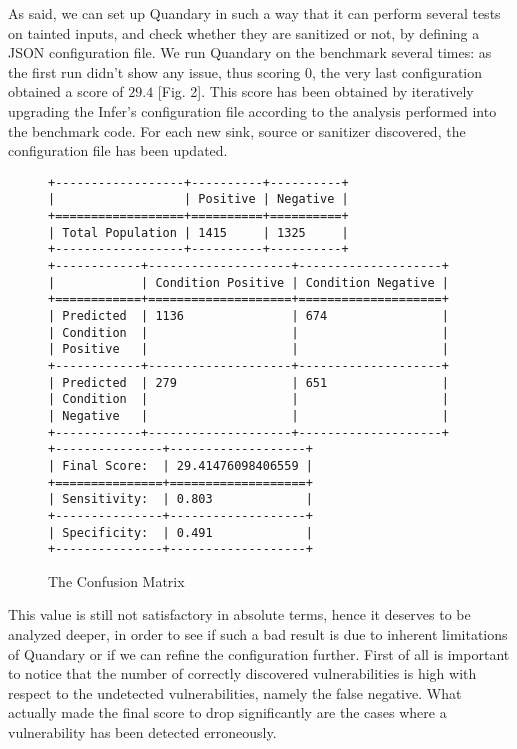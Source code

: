 \documentclass[../Report.tex]{subfiles}
\begin{document}
As said, we can set up Quandary in such a way that it can perform several tests on tainted inputs, and check whether they are sanitized or not, by defining a JSON configuration file. We run Quandary on the benchmark several times: as the first run didn't show any issue, thus scoring $0$, the very last configuration obtained a score of $29.4$ [Fig. 2]. 
This score has been obtained by iteratively upgrading the Infer's configuration file according to the analysis performed into the benchmark code. For each new sink, source or sanitizer discovered, the configuration file has been updated.\\


\begin{figure}
		\small{
			\begin{verbatim}
+------------------+----------+----------+
|                  | Positive | Negative |
+==================+==========+==========+
| Total Population | 1415     | 1325     |
+------------------+----------+----------+
+------------+--------------------+--------------------+
|            | Condition Positive | Condition Negative |
+============+====================+====================+
| Predicted  | 1136               | 674                |
| Condition  |                    |                    |
| Positive   |                    |                    |
+------------+--------------------+--------------------+
| Predicted  | 279                | 651                |
| Condition  |                    |                    |
| Negative   |                    |                    |
+------------+--------------------+--------------------+
+---------------+-------------------+
| Final Score:  | 29.41476098406559 |
+===============+===================+
| Sensitivity:  | 0.803             |
+---------------+-------------------+
| Specificity:  | 0.491             |
+---------------+-------------------+
			\end{verbatim}
		}
	\label{img:confusionmatrix}
	\caption{The Confusion Matrix}
\end{figure}

This value is still not satisfactory in absolute terms, hence it deserves to be analyzed deeper, in order to see if such a bad result is due to inherent limitations of Quandary or if we can refine the configuration further. First of all is important to notice that the number of correctly discovered vulnerabilities is high with respect to the undetected vulnerabilities, namely the false negative. What actually made the final score to drop significantly are the cases where a vulnerability has been detected erroneously.\\
\end{document}
